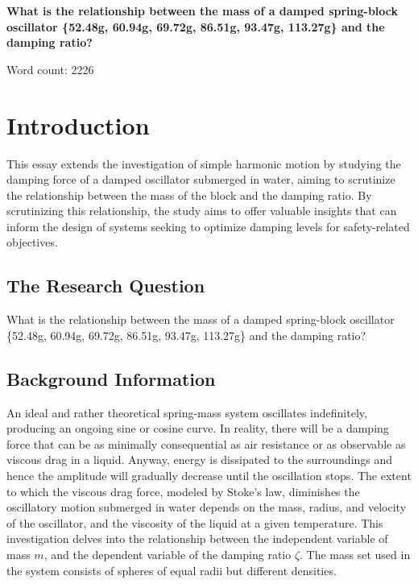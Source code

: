 \documentclass[a4paper,12pt]{article}
\begin{document}
\pagestyle{fancy}


\begin{titlepage}
  \begin{center}
    \vspace*{3cm}

    {\textbf{\Large{What is the relationship between the mass of a damped spring-block oscillator \{52.48g, 60.94g, 69.72g, 86.51g, 93.47g, 113.27g\} and the damping ratio?}}}



    \vspace{4cm}

    Word count: 2226

  \end{center}
\end{titlepage}
\pagebreak
\tableofcontents
\pagebreak

\clearpage
\setcounter{page}{1}

\section{Introduction}
This essay extends the investigation of simple harmonic motion by studying the damping force of a damped oscillator submerged in water, aiming to scrutinize the relationship between the mass of the block and the damping ratio. By scrutinizing this relationship, the study aims to offer valuable insights that can inform the design of systems seeking to optimize damping levels for safety-related objectives.


\subsection{The Research Question}
What is the relationship between the mass of a damped spring-block oscillator \{52.48g, 60.94g, 69.72g, 86.51g, 93.47g, 113.27g\} and the damping ratio?

\subsection{Background Information}
An ideal and rather theoretical spring-mass system oscillates indefinitely, producing an ongoing sine or cosine curve. In reality, there will be a damping force that can be as minimally consequential as air resistance or as observable as viscous drag in a liquid. Anyway, energy is dissipated to the surroundings and hence the amplitude will gradually decrease until the oscillation stops. The extent to which the viscous drag force, modeled by Stoke's law, diminishes the oscillatory motion submerged in water depends on the mass, radius, and velocity of the oscillator, and the viscosity of the liquid at a given temperature. This investigation delves into the relationship between the independent variable of mass $m$, and the dependent variable of the damping ratio $\zeta$. The mass set used in the system consists of spheres of equal radii but different densities.
\end{document}
